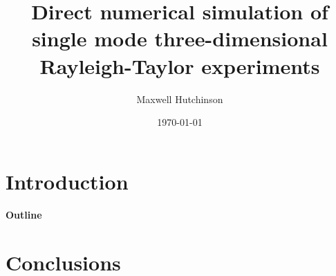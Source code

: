 \documentclass[twocolumn,showpacs,preprintnumbers,amsmath,amssymb,floatfix]{revtex4-1}
\begin{document}
\title{Direct numerical simulation of single mode three-dimensional Rayleigh-Taylor experiments}

\author{Maxwell Hutchinson}

\date{\today}

\begin{abstract}

\end{abstract}

\pacs{}
\maketitle

\section{Introduction}

\paragraph{Outline}

\section{Conclusions}
\end{document}

